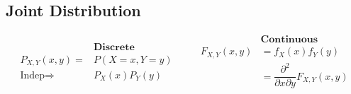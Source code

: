 \subsection*{Joint Distribution}
\begin{equation*}
	\begin{split}
		& \textbf{Discrete}\\
		P_{X,Y}(x,y) = & P(X=x, Y=y)\\
		\text{Indep} \Rightarrow & P_X(x)P_Y(y)
	\end{split}\quad \quad
	\begin{split}
		& \textbf{Continuous}\\
		F_{X,Y}(x,y) & = f_X(x) f_Y(y)\\
		& = \dfrac{\partial^2}{\partial x \partial y} F_{X,Y}(x,y)
	\end{split}
\end{equation*}
